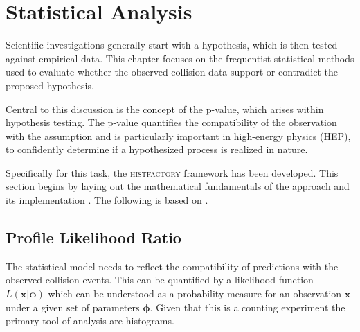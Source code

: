 \chapter{Statistical Analysis}\label{sec:statistics}
Scientific investigations generally start with a hypothesis, which is then tested against empirical data. This chapter focuses on the frequentist statistical methods used to evaluate whether the observed collision data support or contradict the proposed hypothesis.

Central to this discussion is the concept of the p-value, which arises within hypothesis testing. The p-value quantifies the compatibility of the observation with the assumption and is particularly important in high-energy physics (HEP), to confidently determine if a hypothesized process is realized in nature.

Specifically for this task, the \textsc{histfactory} framework has been developed. This section begins by laying out the mathematical fundamentals of the approach and its implementation \citep{pyhf,pyhf_joss}. The following is based on \citep{cowan2011asymptotic,behnke2013data,pyhf}.



\section{Profile Likelihood Ratio}\label{sec:likelihood}
The statistical model needs to reflect the compatibility of predictions with the observed collision events. This can be quantified by a likelihood function $L(\bm{x} | \bm{\phi})$ which can be understood as a probability measure for an observation $\bm{x}$ under a given set of parameters $\bm{\phi}$. Given that this is a counting experiment the primary tool of analysis are histograms.



